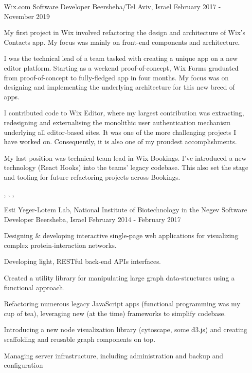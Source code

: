 
\begin{cventries}
  \cventry
    {Wix.com}
    {Software Developer}
    {Beersheba/Tel Aviv, Israel}
    {February 2017 - November 2019}
    {
      \begin{cvitems}
        \item {My first project in Wix involved refactoring the design and architecture of Wix’s Contacts app. My focus was mainly on front-end components and architecture.}
        \item {I was the technical lead of a team tasked with creating a unique app on a new editor platform. Starting as a weekend proof-of-concept, Wix Forms graduated from proof-of-concept to fully-fledged app in four months. My focus was on designing and implementing the underlying architecture for this new breed of apps.}
        \item {I contributed code to Wix Editor, where my largest contribution was extracting, redesigning and externalising the monolithic user authentication mechanism underlying all editor-based sites. It was one of the more challenging projects I have worked on. Consequently, it is also one of my proudest accomplishments.}
        \item {My last position was technical team lead in Wix Bookings. I've introduced a new technology (React Hooks) into the teams' legacy codebase. This also set the stage and tooling for future refactoring projects across Bookings.}
      \end{cvitems}
     }

    \begin{cvskills}
       {}
       {, , , }
    \end{cvskills}

  \cventry
    {Esti Yeger-Lotem Lab, National Institute of Biotechnology in the Negev}
    {Software Developer}
    {Beersheba, Israel}
    {February 2014 - February 2017}
    {
      \begin{cvitems}
        \item {Designing \& developing interactive single-page web applications for visualizing complex protein-interaction networks.}
        \item {Developing light, RESTful back-end APIs interfaces.}
        \item {Created a utility library for manipulating large graph data-structures using a functional approach.}
        \item {Refactoring numerous legacy JavaScript apps (functional programming was my cup of tea), leveraging new (at the time) frameworks to simplify codebase.}
        \item {Introducing a new node visualization library (cytoscape, some d3.js) and creating scaffolding and reusable graph components on top.}
        \item {Managing server infrastructure, including  administration and backup and  configuration}
      \end{cvitems}
    }
    

\end{cventries}
